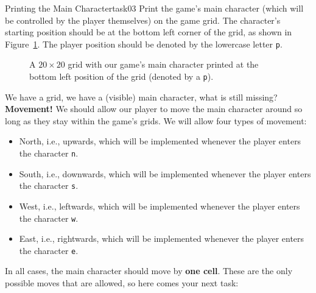 \documentclass[a4paper, 11pt]{article}
\numberwithin{equation}{section}
\theoremstyle{definition}
\newcommand{\player}{\texttt{p}}
\newcommand{\fow}{\texttt{*}}
\begin{document}
	\begin{task}{Printing the Main Character}{task03}
		Print the game's main character (which will be controlled by the player themselves) on the game grid. The character's starting position should be at the bottom left corner of the grid, as shown in Figure~\ref{fig:player on grid}. The player position should be denoted by the lowercase letter \texttt{p}.
	\end{task}
	
	\begin{figure}[tb]
		\centering
		\caption{A $20\times20$ grid with our game's main character printed at the bottom left position of the grid (denoted by a \player).}
		\label{fig:player on grid}
	\end{figure}
	
	We have a grid, we have a (visible) main character, what is still missing? \textbf{Movement!} We should allow our player to move the main character around so long as they stay within the game's grids. We will allow four types of movement:
	\begin{itemize}
		\item North, i.e., upwards, which will be implemented whenever the player enters the character \texttt{n}.
		\item South, i.e., downwards, which will be implemented whenever the player enters the character \texttt{s}.
		\item West, i.e., leftwards, which will be implemented whenever the player enters the character \texttt{w}.
		\item East, i.e., rightwards, which will be implemented whenever the player enters the character \texttt{e}.
	\end{itemize}
	In all cases, the main character should move by \textbf{one cell}. These are the only possible moves that are allowed, so here comes your next task:
	
\end{document}
